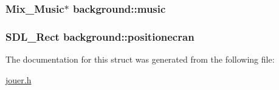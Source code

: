 \subsubsection[{\texorpdfstring{music}{music}}]{\setlength{\rightskip}{0pt plus 5cm}Mix\+\_\+\+Music$\ast$ background\+::music}\hypertarget{structbackground_a8f0644304ef942f20fae345fd7782af3}{}\label{structbackground_a8f0644304ef942f20fae345fd7782af3}
\subsubsection[{\texorpdfstring{positionecran}{positionecran}}]{\setlength{\rightskip}{0pt plus 5cm}S\+D\+L\+\_\+\+Rect background\+::positionecran}\hypertarget{structbackground_ad439c2936039aabe3bdc580b6d6f66f0}{}\label{structbackground_ad439c2936039aabe3bdc580b6d6f66f0}


The documentation for this struct was generated from the following file\+:\begin{DoxyCompactItemize}
\item 
\hyperlink{jouer_8h}{jouer.\+h}\end{DoxyCompactItemize}
